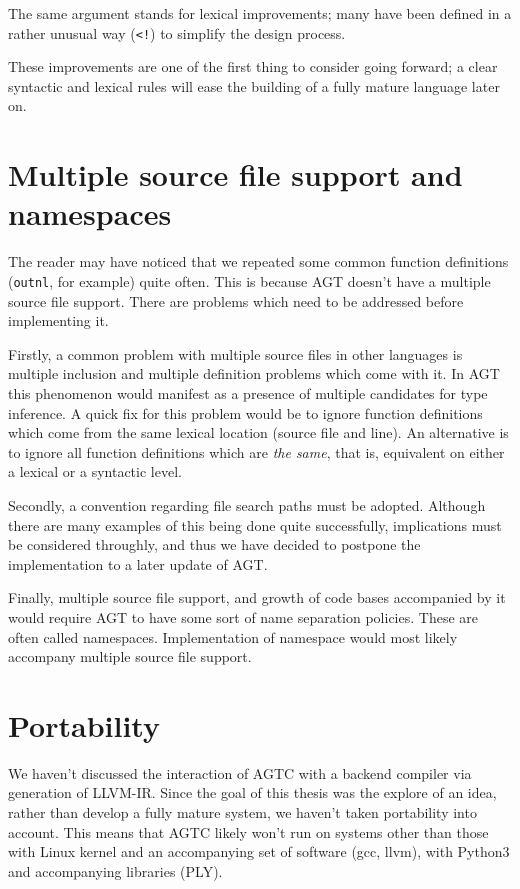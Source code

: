 \documentclass[times, utf8, diplomski]{fer}
\theoremstyle{definition}
\begin{document}
The same argument stands for lexical improvements; many have been defined in a rather unusual way
(\texttt{<!}) to simplify the design process.

These improvements are one of the first thing to consider going forward;
a clear syntactic and lexical rules will ease the building of a fully mature language later on.

\section{Multiple source file support and namespaces}

The reader may have noticed that we repeated some common function definitions
(\texttt{outnl}, for example) quite often. This is because AGT doesn't have a multiple source file
support. There are problems which need to be addressed before implementing it.

Firstly, a common problem with multiple source files in other languages is multiple inclusion
and multiple definition problems which come with it. In AGT this phenomenon would manifest
as a presence of multiple candidates for type inference. A quick fix for this problem would be
to ignore function definitions which come from the same lexical location (source file and line).
An alternative is to ignore all function definitions which are \textit{the same}, that is,
equivalent on either a lexical or a syntactic level.

Secondly, a convention regarding file search paths must be adopted. Although there are many
examples of this being done quite successfully, implications must be considered throughly,
and thus we have decided to postpone the implementation to a later update of AGT.

Finally, multiple source file support, and growth of code bases accompanied by it would require
AGT to have some sort of name separation policies. These are often called namespaces.
Implementation of namespace would most likely accompany multiple source file support.

\section{Portability}

We haven't discussed the interaction of AGTC with a backend compiler via generation of LLVM-IR.
Since the goal of this thesis was the explore of an idea, rather than develop a fully mature system,
we haven't taken portability into account. This means that AGTC likely won't run on systems
other than those with Linux kernel and an accompanying set of software (gcc, llvm),
with Python3 and accompanying libraries (PLY).
\end{document}
